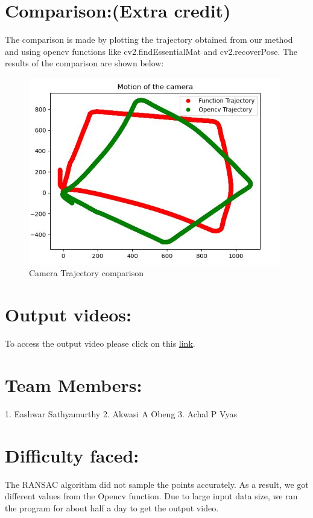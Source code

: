 \documentclass[12pt]{article}
\begin{document}
\section{Comparison:(Extra credit)}
The comparison is made by plotting the trajectory obtained from our method and using opencv functions like cv2.findEssentialMat and cv2.recoverPose. The results of the comparison are shown below:
\begin{figure}[h]
    \centering
    \includegraphics[width=11cm]{output2}
    \caption{Camera Trajectory comparison}
    \label{fig:Camera Trajectory comparison}
\end{figure}

\section{Output videos:}
To access the output video please click on this \href{https://drive.google.com/drive/folders/1bHtRRyyHCVfVULQ9rLM1Tsxr-f1liSLU?usp=sharing}{\underline{link}}.

\section{Team Members:}
1. Eashwar Sathyamurthy
2. Akwasi A Obeng
3. Achal P Vyas

\section{Difficulty faced:}
The RANSAC algorithm did not sample the points accurately. As a result, we got different values from the Opencv function. Due to large input data size, we ran the program for about half a day to get the output video.
\end{document}
